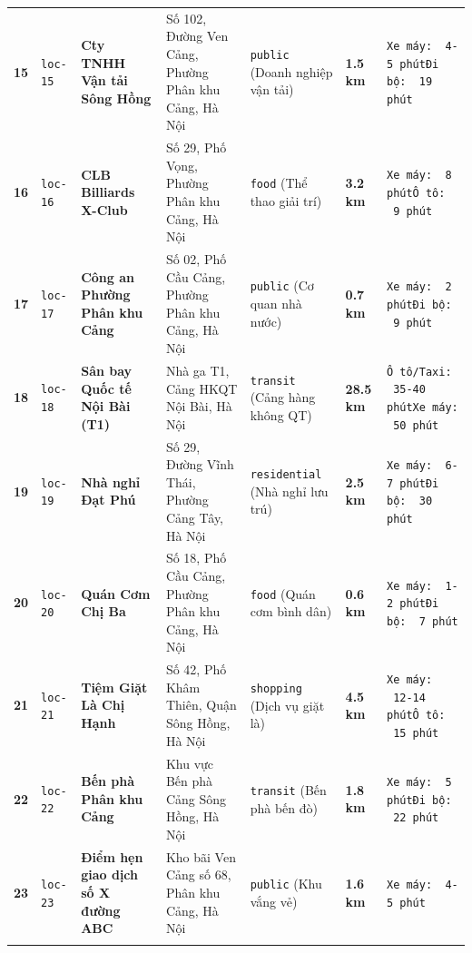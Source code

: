 \documentclass[12pt,a4paper]{article}
\begin{document}
\begin{xltabular}{\textwidth}{C{0.6cm} C{1.1cm} L{2.2cm} L{2.8cm} L{2.0cm} C{1.8cm} >{\raggedright\arraybackslash}X}
\textbf{15} & \texttt{loc-15} & \textbf{Cty TNHH Vận tải Sông Hồng} & Số 102, Đường Ven Cảng, Phường Phân khu Cảng, Hà Nội & \texttt{public} (Doanh nghiệp vận tải) & \textbf{1.5 km} & \texttt{Xe máy: ~4-5 phút}\newline \texttt{Đi bộ: ~19 phút} \\ \addlinespace[4pt]
\textbf{16} & \texttt{loc-16} & \textbf{CLB Billiards X-Club} & Số 29, Phố Vọng, Phường Phân khu Cảng, Hà Nội & \texttt{food} (Thể thao giải trí) & \textbf{3.2 km} & \texttt{Xe máy: ~8 phút}\newline \texttt{Ô tô: ~9 phút} \\ \addlinespace[4pt]
\textbf{17} & \texttt{loc-17} & \textbf{Công an Phường Phân khu Cảng} & Số 02, Phố Cầu Cảng, Phường Phân khu Cảng, Hà Nội & \texttt{public} (Cơ quan nhà nước) & \textbf{0.7 km} & \texttt{Xe máy: ~2 phút}\newline \texttt{Đi bộ: ~9 phút} \\ \addlinespace[4pt]
\textbf{18} & \texttt{loc-18} & \textbf{Sân bay Quốc tế Nội Bài (T1)} & Nhà ga T1, Cảng HKQT Nội Bài, Hà Nội & \texttt{transit} (Cảng hàng không QT) & \textbf{28.5 km} & \texttt{Ô tô/Taxi: ~35-40 phút}\newline \texttt{Xe máy: ~50 phút} \\ \addlinespace[4pt]
\textbf{19} & \texttt{loc-19} & \textbf{Nhà nghỉ Đạt Phú} & Số 29, Đường Vĩnh Thái, Phường Cảng Tây, Hà Nội & \texttt{residential} (Nhà nghỉ lưu trú) & \textbf{2.5 km} & \texttt{Xe máy: ~6-7 phút}\newline \texttt{Đi bộ: ~30 phút} \\ \addlinespace[4pt]
\textbf{20} & \texttt{loc-20} & \textbf{Quán Cơm Chị Ba} & Số 18, Phố Cầu Cảng, Phường Phân khu Cảng, Hà Nội & \texttt{food} (Quán cơm bình dân) & \textbf{0.6 km} & \texttt{Xe máy: ~1-2 phút}\newline \texttt{Đi bộ: ~7 phút} \\ \addlinespace[4pt]
\textbf{21} & \texttt{loc-21} & \textbf{Tiệm Giặt Là Chị Hạnh} & Số 42, Phố Khâm Thiên, Quận Sông Hồng, Hà Nội & \texttt{shopping} (Dịch vụ giặt là) & \textbf{4.5 km} & \texttt{Xe máy: ~12-14 phút}\newline \texttt{Ô tô: ~15 phút} \\ \addlinespace[4pt]
\textbf{22} & \texttt{loc-22} & \textbf{Bến phà Phân khu Cảng} & Khu vực Bến phà Cảng Sông Hồng, Hà Nội & \texttt{transit} (Bến phà bến đò) & \textbf{1.8 km} & \texttt{Xe máy: ~5 phút}\newline \texttt{Đi bộ: ~22 phút} \\ \addlinespace[4pt]
\textbf{23} & \texttt{loc-23} & \textbf{Điểm hẹn giao dịch số X đường ABC} & Kho bãi Ven Cảng số 68, Phân khu Cảng, Hà Nội & \texttt{public} (Khu vắng vẻ) & \textbf{1.6 km} & \texttt{Xe máy: ~4-5 phút} \\ \addlinespace[4pt]
\end{xltabular}
\endgroup
\end{document}

